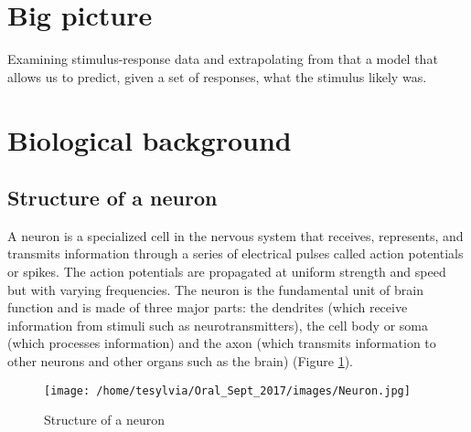 
\section{Big picture}
 
Examining stimulus-response data and extrapolating from that a model
that allows us to predict, given a set of responses, what the stimulus 
likely was.






\section{Biological background}
\subsection{Structure of a neuron}
A neuron is a specialized cell in the nervous system that receives, represents, and transmits information through a series of electrical pulses called action potentials or spikes. The action potentials are propagated at uniform strength and speed but with varying frequencies. The neuron is the fundamental unit of brain function and is made of three major parts: the dendrites (which receive information from stimuli such as neurotransmitters), the cell body or soma (which processes information) and the axon (which transmits information to other neurons and other organs such as the brain) (Figure \ref{fig:Neuron}).

\begin{figure}[h]
\centering
\texttt{[image: /home/tesylvia/Oral\_Sept\_2017/images/Neuron.jpg]}
\caption{Structure of  a neuron}
      \label{fig:Neuron}
\end{figure}


